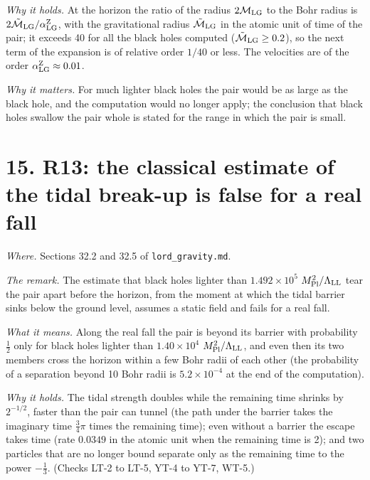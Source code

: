\documentclass[
  10pt,
]{article}
\begin{document}
\emph{Why it holds.} At the horizon the ratio of the radius
\(2\mathcal M_{\rm LG}\) to the Bohr radius is
\(2\tilde{\mathcal M}_{\rm LG}/\alpha^{\rm Z}_{\rm LG}\), with the
gravitational radius \(\tilde{\mathcal M}_{\rm LG}\) in the atomic unit
of time of the pair; it exceeds 40 for all the black holes computed
(\(\tilde{\mathcal M}_{\rm LG}\ge0.2\)), so the next term of the
expansion is of relative order \(1/40\) or less. The velocities are of
the order \(\alpha^{\rm Z}_{\rm LG}\approx0.01\).

\emph{Why it matters.} For much lighter black holes the pair would be as
large as the black hole, and the computation would no longer apply; the
conclusion that black holes swallow the pair whole is stated for the
range in which the pair is small.

\hypertarget{r13-the-classical-estimate-of-the-tidal-break-up-is-false-for-a-real-fall}{%
\section{15. R13: the classical estimate of the tidal break-up is false
for a real
fall}\label{r13-the-classical-estimate-of-the-tidal-break-up-is-false-for-a-real-fall}}

\emph{Where.} Sections 32.2 and 32.5 of \texttt{lord\_gravity.md}.

\emph{The remark.} The estimate that black holes lighter than
\(1.492\times10^{5}\) \(M_{\rm Pl}^2/\Lambda_{\rm LL}\) tear the pair
apart before the horizon, from the moment at which the tidal barrier
sinks below the ground level, assumes a static field and fails for a
real fall.

\emph{What it means.} Along the real fall the pair is beyond its barrier
with probability \(\tfrac12\) only for black holes lighter than
\(1.40\times10^{4}\) \(M_{\rm Pl}^2/\Lambda_{\rm LL}\), and even then
its two members cross the horizon within a few Bohr radii of each other
(the probability of a separation beyond 10 Bohr radii is
\(5.2\times10^{-4}\) at the end of the computation).

\emph{Why it holds.} The tidal strength doubles while the remaining time
shrinks by \(2^{-1/2}\), faster than the pair can tunnel (the path under
the barrier takes the imaginary time \(\tfrac34\pi\) times the remaining
time); even without a barrier the escape takes time (rate \(0.0349\) in
the atomic unit when the remaining time is 2); and two particles that
are no longer bound separate only as the remaining time to the power
\(-\tfrac13\). (Checks LT-2 to LT-5, YT-4 to YT-7, WT-5.)
\end{document}
